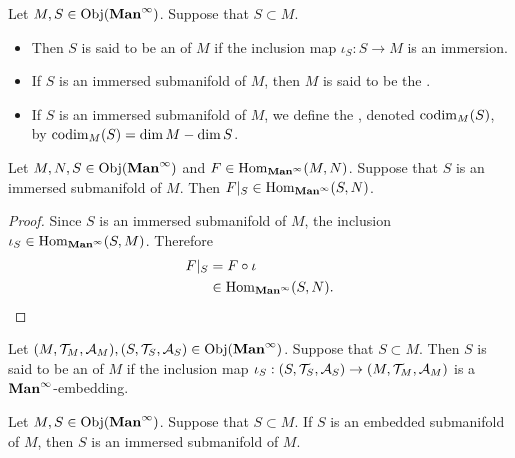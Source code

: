 \documentclass{book}
\begin{document}


\begin{defn} 
	Let $M, S \in \operatorname{Obj}(\operatorname*{\text{\textbf{Man}}^{\infty}})$. Suppose that $S \subset M$.
	\begin{itemize}
		\item Then $S$ is said to be an  of $M$ if the inclusion map $\iota_S:S \rightarrow M$ is an immersion.
		\item If $S$ is an immersed submanifold of $M$, then $M$ is said to be the .
		\item If $S$ is an immersed submanifold of $M$, we define the , denoted $\operatorname{codim}_M(S)$, by $\operatorname{codim}_M(S) = \dim M - \dim S$. 
	\end{itemize}
\end{defn}

\begin{ex} 
	Let $M, N, S \in \operatorname{Obj}(\operatorname*{\text{\textbf{Man}}^{\infty}})$ and $F \in \operatorname{Hom}_{\operatorname*{\text{\textbf{Man}}^{\infty}}}(M, N)$. Suppose that $S$ is an immersed submanifold of $M$. Then $F|_S \in \operatorname{Hom}_{\operatorname*{\text{\textbf{Man}}^{\infty}}}(S, N)$.   
\end{ex}

\begin{proof} 
	Since $S$ is an immersed submanifold of $M$, the inclusion $\iota_S \in \operatorname{Hom}_{\operatorname*{\text{\textbf{Man}}^{\infty}}}(S, M)$. Therefore
	\begin{align*}
		F|_S
		& = F \circ \iota \\
		& \in \operatorname{Hom}_{\operatorname*{\text{\textbf{Man}}^{\infty}}}(S, N).
	\end{align*}
\end{proof}

	\begin{defn} 
		Let $(M, \mathcal{T}_M, \mathcal{A}_M), (S, \mathcal{T}_S, \mathcal{A}_S) \in \operatorname{Obj}(\operatorname*{\text{\textbf{Man}}^{\infty}})$. Suppose that $S \subset M$. Then $S$ is said to be an  of $M$ if the inclusion map $\iota_S:(S, \mathcal{T}_S, \mathcal{A}_S) \rightarrow (M, \mathcal{T}_M, \mathcal{A}_M)$ is a $\operatorname*{\text{\textbf{Man}}^{\infty}}$-embedding.
	\end{defn}

	\begin{ex} 
		Let $M, S \in \operatorname{Obj}(\operatorname*{\text{\textbf{Man}}^{\infty}})$. Suppose that $S \subset M$. If $S$ is an embedded submanifold of $M$, then $S$ is an immersed submanifold of $M$.
	\end{ex}
\end{document}
